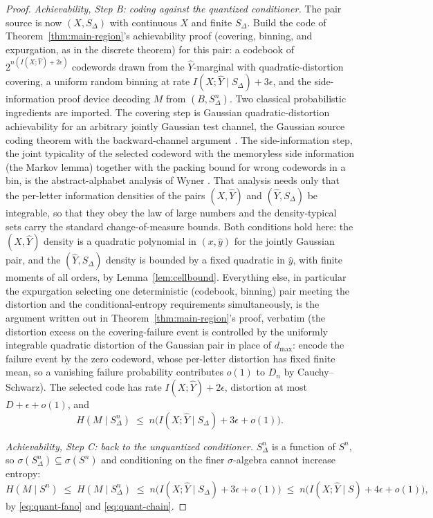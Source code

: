﻿\documentclass[11pt,onecolumn]{IEEEtran}
\newcommand{\hY}{\widehat{Y}}
\begin{document}
\begin{proof}
\emph{Achievability, Step B: coding against the quantized conditioner.}
The pair source is now $(X,S_\Delta)$ with continuous $X$ and finite
$S_\Delta$. Build the code of Theorem~\ref{thm:main-region}'s
achievability proof (covering, binning, and expurgation, as in the
discrete theorem) for this pair: a codebook of
$2^{n(I(X;\hY)+2\epsilon)}$ codewords drawn from the $\hY$-marginal
with quadratic-distortion covering, a uniform random binning at rate
$I(X;\hY\mid S_\Delta)+3\epsilon$, and the side-information proof
device decoding $M$ from $(B,S_\Delta^n)$. Two classical probabilistic
ingredients are imported. The covering step is Gaussian
quadratic-distortion achievability for an arbitrary jointly Gaussian
test channel, the Gaussian source coding theorem with the
backward-channel argument \cite{berger1971}. The side-information step,
the joint typicality of the selected codeword with the memoryless side
information (the Markov lemma) together with the packing bound for
wrong codewords in a bin, is the abstract-alphabet analysis of Wyner
\cite{wyner1978}. That analysis needs only that the per-letter
information densities of the pairs $(X,\hY)$ and $(\hY,S_\Delta)$ be
integrable, so that they obey the law of large numbers and the
density-typical sets carry the standard change-of-measure bounds. Both
conditions hold here: the $(X,\hY)$ density is a quadratic polynomial
in $(x,\hat y)$ for the jointly Gaussian pair, and the
$(\hY,S_\Delta)$ density is bounded by a fixed quadratic in $\hat y$,
with finite moments of all orders, by Lemma~\ref{lem:cellbound}.
Everything else,
in particular the expurgation selecting one deterministic
(codebook, binning) pair meeting the distortion and the
conditional-entropy requirements simultaneously, is the argument
written out in Theorem~\ref{thm:main-region}'s proof, verbatim (the
distortion excess on the covering-failure event is controlled by the
uniformly integrable quadratic distortion of the Gaussian pair in place
of $d_{\max}$: encode the failure event by the zero codeword, whose
per-letter distortion has fixed finite mean, so a vanishing failure
probability contributes $o(1)$ to $D_n$ by Cauchy--Schwarz). The
selected code has rate $I(X;\hY)+2\epsilon$, distortion at most
$D+\epsilon+o(1)$, and
\begin{equation}
H(M\mid S_\Delta^n)\;\le\;
n\bigl(I(X;\hY\mid S_\Delta)+3\epsilon+o(1)\bigr).
\label{eq:quant-fano}
\end{equation}

\emph{Achievability, Step C: back to the unquantized conditioner.}
$S_\Delta^n$ is a function of $S^n$, so
$\sigma(S_\Delta^n)\subseteq\sigma(S^n)$ and conditioning on the finer
$\sigma$-algebra cannot increase entropy:
\begin{equation}
H(M\mid S^n)\;\le\;H(M\mid S_\Delta^n)
\;\le\;n\bigl(I(X;\hY\mid S_\Delta)+3\epsilon+o(1)\bigr)
\;\le\;n\bigl(I(X;\hY\mid S)+4\epsilon+o(1)\bigr),
\label{eq:quant-back}
\end{equation}
by \eqref{eq:quant-fano} and \eqref{eq:quant-chain}.


\end{proof}
\end{document}
